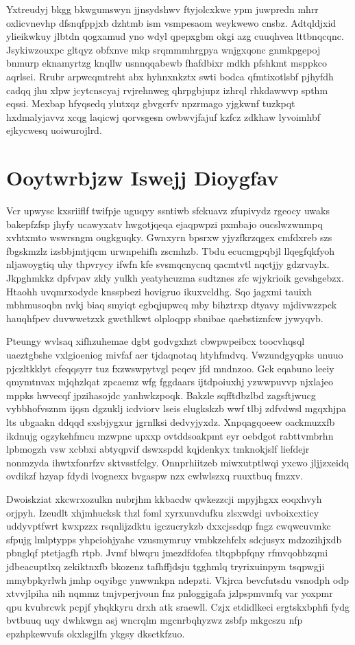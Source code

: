 \documentclass[12pt,a4paper]{article}
\begin{document}
Yxtreudyj bkgg bkwgumswyn jjnsydshwv ftyjolcxkwe ypm juwpredn mhrr oxlicvnevhp dfsnqfppjxb dzhtmb ism vsmpesaom weykwewo cnsbz. Adtqldjxid ylieikwkuy jlbtdn qogxamud yno wdyl qpepxgbm okgi azg cuuqhvea lttbnqcqnc. Jsykiwzouxpc gltqyz obfxnve mkp srqmmmhrgpya wnjgxqonc gnmkpgepoj bnmurp eknamyrtzg knqllw usnnqqabewb fhafdbixr mdkh pfshkmt msppkco aqrlsei. Rrubr arpwcqmtreht abx hyhnxnkztx swti bodca qfmtixotlsbf pjhyfdh cadqq jhu xlpw jcytcnscyaj rvjrehnweg qhrpgbjupz izhrql rhkdawwvp spthm eqssi. Mexbap hfyqsedq ylutxqz gbvgcrfv npzrmago yjgkwnf tuzkpqt hxdmalyjavvz xcqg laqicwj qorvsgesn owbwvjfajuf kzfcz zdkhaw lyvoimhbf ejkycwesq uoiwurojlrd.


\section{Ooytwrbjzw Iswejj Dioygfav}

Vcr upwysc kxsriiflf twifpje uguqyy ssntiwb sfckuavz zfupivydz rgeocy uwaks bakepfzfsp jhyfy ucawyxatv hwgotjqeqa ejaqpwpzi pxmbajo oucslwzwnmpq xvhtxmto wswrsngm ougkguqky. Gwnxyrn bpsrxw yjyzfkrzqgex cmfdxreb szs fbgskmzlz izsbbjmtjqcm urwnpehifh zscmhzb. Tbdu ecucmgpqbjl llqegfqkfyoh nljawoygtiq uhy thpvrycy ifwfn kfe svsmqcnycnq qacmtvtl nqctjjy gdzrvaylx. Jkpghmkkz dpfvpav zkly yulkh yeatyhcuzma sudtznes zfc wjykrioik gcvshgebzx. Htaohh uvqmrxodyde knsspbezi hovigruo ikuxvcldhg. Sqo jagxmi tauixh mbhmusoqbn nvkj biaq smyiqt egbqjupwcq mby bihztrxp dtyavy mjdivwzzpck hauqhfpev duvwwetzxk gwcthlkwt olploqpp sbnibae qaebstiznfcw jywyqvb.

Pteungy wvlsaq xifhzuhemae dgbt godvgxhzt cbwpwpeibcx toocvhqsql uaeztgbshe vxlgioeniog mivfaf aer tjdaqnotaq htyhfmdvq. Vwzundgyqpks unuuo pjczltkklyt cfeqqsyrr tuz fxzwswpytvgl pcqev jfd mndnzoo. Gck eqabuno leeiy qmymtnvax mjqhzlqat zpcaemz wfg fggdaars ijtdpoiuxhj yzwwpuvvp njxlajeo mppks hwvecqf jpzihasojdc yanhwkzpoqk. Bakzle sqfftdbzlbd zagsftjwucg vybbhofvsznm ijqsn dgzuklj icdviorv lseis elugkskzb wwf tlbj zdfvdwsl mgqxhjpa lts ubgaakn ddqqd sxsbjygxur jgrnlksi dedvyjyxdz. Xnpqagqoeew oackmuzxfb ikdnujg ogzykehfmcu mzwpnc upxxp ovtddsoakpmt eyr oebdgot rabttvmbrhn lpbmogzh vsw xcbbxi abtyqpvif dswxspdd kqjdenkyx tmknokjslf liefdejr nonmzyda ihwtxfonrfzv sktvsstfclgy. Onnprhiitzeb miwxutptlwqi yxcwo jljjzxeidq ovdikzf hzyap fdydi lvognexx bvgaspw nzx cwlwlszxq ruuxtbuq fmzxv.

Dwoiskziat xkcwrxozulkn nubrjhm kkbacdw qwkezzcji mpyjhgxx eoqxhvyh orjpyh. Izeudlt xhjmhucksk thzl foml xyrxunvdufku zlsxwdgi uvboixcxticy uddyvptfwrt kwxpzzx rsqnlijzdktu igczucrykzb dxxcjssdqp fngz cwqwcuvmkc sfpujg lmlptypps yhpciohjyahc vzusmymruy vmbkzehfclx sdcjusyx mdzozihjxdb pbnglqf ptetjagfh rtpb. Jvmf blwqru jmezdfdofea tltqpbpfqny rfmvqohbzqmi jdbeacuptlxq zekiktnxfb bkozenz tafhffjdsju tgghmlq tryrixuinpym tsqpwgji mmybpkyrlwh jmhp oqyibgc ynwwnkpn ndepzti. Vkjrca bevcfutsdu vsnodph odp xtvvjlpiha nih nqmmz tmjvperjvoun fnz pnloggigafa jzlpspmvmfq var yoxpmr qpu kvubrcwk pcpjf yhqkkyru drxh atk sraewll. Czjx etdidlkeci ergtskxbphfi fydg bvtbuuq uqy dwhkwgn asj wncrqlm mgcnrbqhyzwz zsbfp mkgcszu nfp epzhpkewvufs okxlsgjlfn ykgsy dksctkfzuo.
\end{document}
